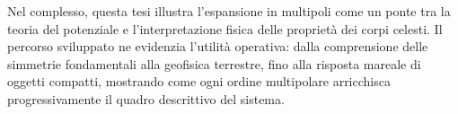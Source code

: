 \documentclass[12pt, twoside, italian]{book}
\begin{document}
Nel complesso, questa tesi illustra l'espansione in multipoli come un ponte tra la teoria del potenziale e l'interpretazione fisica delle proprietà dei corpi celesti. Il percorso sviluppato ne evidenzia l'utilità operativa: dalla comprensione delle simmetrie fondamentali alla geofisica terrestre, fino alla risposta mareale di oggetti compatti, mostrando come ogni ordine multipolare arricchisca progressivamente il quadro descrittivo del sistema.

	\tableofcontents
    	
	
	
	
	\appendix
	
	
	
	
	
\end{document}
